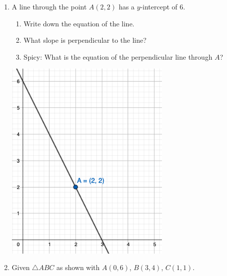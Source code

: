 \begin{enumerate}
\item A line through the point $A(2,2)$ has a $y$-intercept of 6. 
\begin{enumerate}
  \item Write down the equation of the line.
  \item What slope is perpendicular to the line?
  \item Spicy: What is the equation of the perpendicular line through $A$?
\end{enumerate}
\begin{flushright}
  \includegraphics[width=8cm]{../graphics/06perpendicular.png}
\end{flushright}

\item Given $\triangle ABC$ as shown with $A(0,6)$, $B(3,4)$, $C(1,1)$.


\end{enumerate}
